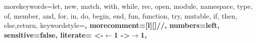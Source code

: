 \usepackage{listings}
\usepackage{color}
                {morekeywords={let, new, match, with, while, rec, open, module, namespace, type, of, member, and, for, in, do, begin, end, fun, function, try, mutable, if, then, else,return}, 
    keywordstyle=\bfseries,
    morecomment=[l][\color{graycomments}]{//},
    numbers=left,
    sensitive=false,
    literate=
        {<-}{$\leftarrow{}$}{1}
        {->}{$\rightarrow{}$}{1},
    }
